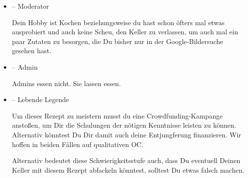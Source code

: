\begin{itemize}[leftmargin=*]
	\item[] \diffmoderator{} -- Moderator

		Dein Hobby ist Kochen beziehungsweise du hast schon öfters mal etwas ausprobiert und auch keine Scheu, den Keller zu verlassen, um auch mal ein paar Zutaten zu besorgen, die Du bisher nur in der Google-Bildersuche gesehen hast.

	\item[] \diffadmin{} -- Admin

		Admins essen nicht. Sie lassen essen.

	\item[]
	\difflegende{} -- Lebende Legende

		Um dieses Rezept zu meistern musst du eine Crowdfunding-Kampange anstoßen, um Dir die Schulungen der nötigen Kenntnisse leisten zu können. Alternativ könntest Du Dir damit auch deine Entjungferung finanzieren. Wir hoffen in beiden Fällen auf qualitativen OC.

		Alternativ bedeutet diese Schwierigkeitsstufe auch, dass Du eventuell Deinen Keller mit diesem Rezept abfackeln könntest, solltest Du etwas falsch machen.
\end{itemize}
